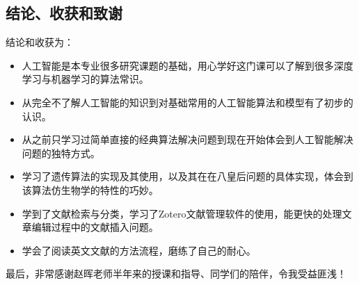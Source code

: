 \documentclass[12pt,a4paper,UTF8]{ctexart}
\begin{document}
\subsection{结论、收获和致谢}
结论和收获为：
\begin{itemize}
    \item 人工智能是本专业很多研究课题的基础，用心学好这门课可以了解到很多深度学习与机器学习的算法常识。
    \item 从完全不了解人工智能的知识到对基础常用的人工智能算法和模型有了初步的认识。
    \item 从之前只学习过简单直接的经典算法解决问题到现在开始体会到人工智能解决问题的独特方式。
    \item 学习了遗传算法的实现及其使用，以及其在在八皇后问题的具体实现，体会到该算法仿生物学的特性的巧妙。
    \item 学到了文献检索与分类，学习了Zotero文献管理软件的使用，能更快的处理文章编辑过程中的文献插入问题。
    \item 学会了阅读英文文献的方法流程，磨练了自己的耐心。
\end{itemize}

最后，非常感谢赵晖老师半年来的授课和指导、同学们的陪伴，令我受益匪浅！


\end{document}
